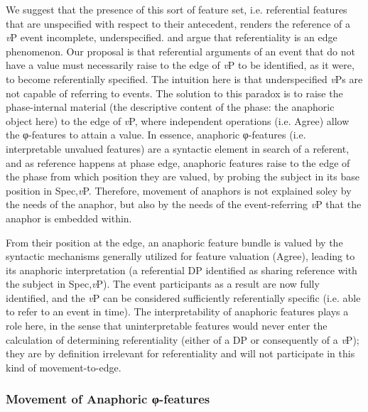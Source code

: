 We suggest that the presence of this sort of feature set, i.e. referential features that are unspecified with respect to their antecedent, renders the reference of a \textit{v}P event incomplete, underspecified. \citet{Hinzen:2012} and \citet{SheehanHinzen:2011} argue that referentiality is an edge phenomenon. Our proposal is that referential arguments of an event that do not have a value must necessarily raise to the edge of \textit{v}P to be identified, as it were, to become referentially specified. The intuition here is that underspecified \textit{v}Ps are not capable of referring to events. The solution to this paradox is to raise the phase-internal material (the descriptive content of the phase: the anaphoric object here) to the edge of \textit{v}P, where independent operations (i.e. Agree) allow the φ-features to attain a value. In essence, anaphoric φ-features (i.e. interpretable unvalued features) are a syntactic element in search of a referent, and as reference happens at phase edge, anaphoric features raise to the edge of the phase from which position they are valued, by probing the subject in its base position in Spec,\textit{v}P. Therefore, movement of anaphors is not explained soley by the needs of the anaphor, but also by the needs of the event-referring \textit{v}P that the anaphor is embedded within.

From their position at the edge, an anaphoric feature bundle is valued by the syntactic mechanisms generally utilized for feature valuation (Agree), leading to its anaphoric interpretation (a referential DP identified as sharing reference with the subject in Spec,\textit{v}P). The event participants as a result are now fully identified, and the \textit{v}P can be considered sufficiently referentially specific (i.e. able to refer to an event in time). The interpretability of anaphoric features plays a role here, in the sense that uninterpretable features would never enter the calculation of determining referentiality (either of a DP or consequently of a \textit{v}P); they are by definition irrelevant for referentiality and will not participate in this kind of movement-to-edge.

\subsubsection{Movement of Anaphoric φ-features}

